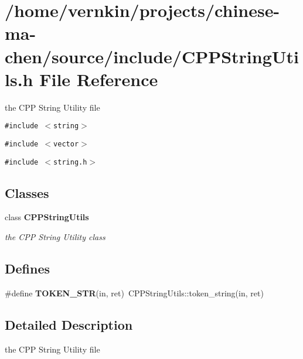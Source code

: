 \section{/home/vernkin/projects/chinese-ma-chen/source/include/CPPStringUtils.h File Reference}
\label{CPPStringUtils_8h}
the CPP String Utility file  


{\tt \#include $<$string$>$}\par
{\tt \#include $<$vector$>$}\par
{\tt \#include $<$string.h$>$}\par
\subsection*{Classes}
\begin{CompactItemize}
\item 
class {\bf CPPStringUtils}
\begin{CompactList}\small\item\em the CPP String Utility class \item\end{CompactList}\end{CompactItemize}
\subsection*{Defines}
\begin{CompactItemize}
\item 
\#define \textbf{TOKEN\_\-STR}(in, ret)~CPPStringUtils::token\_\-string(in, ret)\label{CPPStringUtils_8h_0c4bf3840f8463665e3d39163a903a37}

\end{CompactItemize}


\subsection{Detailed Description}
the CPP String Utility file 

